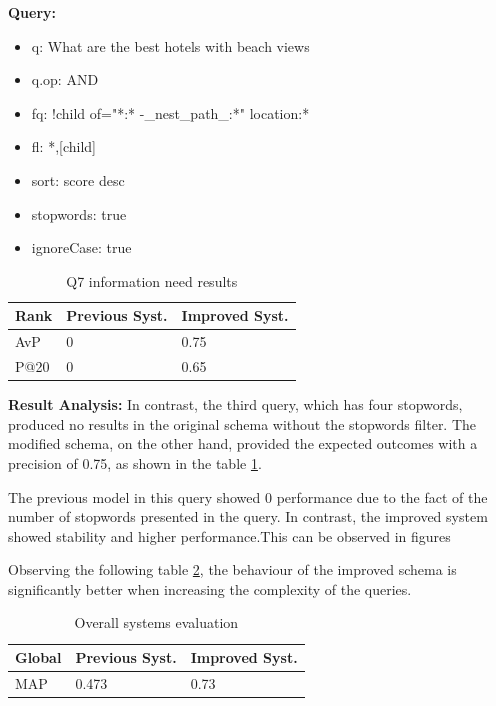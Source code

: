 \documentclass[sigconf]{acmart}
\begin{document}
\textbf{Query:}

\begin{itemize}
    \item q: What are the best hotels with beach views
    \item q.op: AND
    \item fq: {!child of="*:* -\_nest\_path\_:*"} location:*
    \item fl: *,[child]
    \item sort: score desc
    \item stopwords: true
    \item ignoreCase: true
\end{itemize}

\begin{table}[H]
\caption{Q7 information need results}
\label{tab:q7}
\begin{tabular}{lll}
\toprule
Rank & Previous Syst. & Improved Syst.\\
\midrule
AvP & 0 & 0.75  \\
P@20 & 0 & 0.65 \\
\bottomrule
\end{tabular}
\end{table}

\textbf{Result Analysis:} In contrast, the third query, which has four stopwords, produced no results in the original schema without the stopwords filter. The modified schema, on the other hand, provided the expected outcomes with a precision of 0.75, as shown in the table \ref{tab:q7}.

The previous model in this query showed 0 performance due to the fact of the number of stopwords presented in the query. In contrast, the improved system showed stability and higher performance.This can be observed in figures

Observing the following table \ref{tab:map_stopwords}, the behaviour of the improved schema is significantly better when increasing the complexity of the queries.

\begin{table}[H]
\caption{Overall systems evaluation}
\label{tab:map_stopwords}
\begin{tabular}{lll}
\toprule
Global & Previous Syst. & Improved Syst.\\
\midrule
MAP & 0.473 & 0.73  \\

\bottomrule
\end{tabular}
\end{table}
\end{document}
